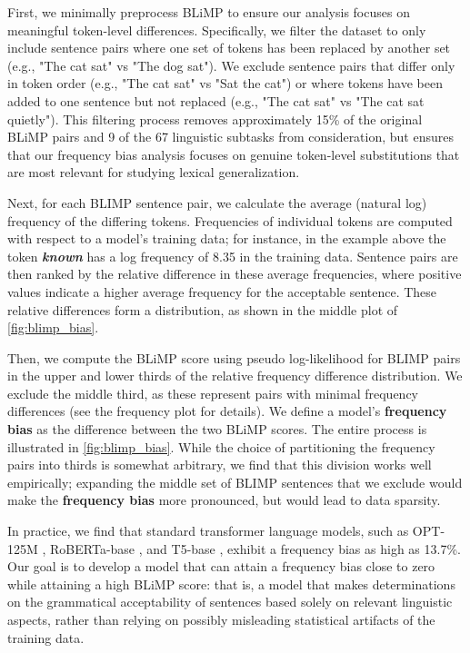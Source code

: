 First, we minimally preprocess BLiMP to ensure our analysis focuses on meaningful token-level differences. Specifically, we filter the dataset to only include sentence pairs where one set of tokens has been replaced by another set (e.g., "The cat sat" vs "The dog sat"). We exclude sentence pairs that differ only in token order (e.g., "The cat sat" vs "Sat the cat") or where tokens have been added to one sentence but not replaced (e.g., "The cat sat" vs "The cat sat quietly"). This filtering process removes approximately 15\% of the original BLiMP pairs and 9 of the 67 linguistic subtasks from consideration, but ensures that our frequency bias analysis focuses on genuine token-level substitutions that are most relevant for studying lexical generalization.

Next, for each BLIMP sentence pair, we calculate the average (natural log) frequency of the differing tokens. Frequencies of individual tokens are computed with respect to a model's training data; for instance, in the example above the token \textit{\textbf{known}} has a log frequency of 8.35 in the training data. Sentence pairs are then ranked by the relative difference in these average frequencies, where positive values indicate a higher average frequency for the acceptable sentence. These relative differences form a distribution, as shown in the middle plot of \cref{fig:blimp_bias}. 

Then, we compute the BLiMP score using pseudo log-likelihood \citep{salazar2020masked} for BLIMP pairs in the upper and lower thirds of the relative frequency difference distribution. We exclude the middle third, as these represent pairs with minimal frequency differences (see the frequency plot for details). We define a model's \textbf{frequency bias} as the difference between the two BLiMP scores. The entire process is illustrated in \cref{fig:blimp_bias}. While the choice of partitioning the frequency pairs into thirds is somewhat arbitrary, we find that this division works well empirically; expanding the middle set of BLIMP sentences that we exclude would make the \textbf{frequency bias} more pronounced, but would lead to data sparsity. 

In practice, we find that standard transformer language models, such as OPT-125M \citep{zhang2022opt}, RoBERTa-base \citep{liu2019roberta}, and T5-base \citep{raffel2020t5}, exhibit a frequency bias as high as 13.7\%. Our goal is to develop a model that can attain a frequency bias close to zero while attaining a high BLiMP score: that is, a model that makes determinations on the grammatical acceptability of sentences based solely on relevant linguistic aspects, rather than relying on possibly misleading statistical artifacts of the training data. 

